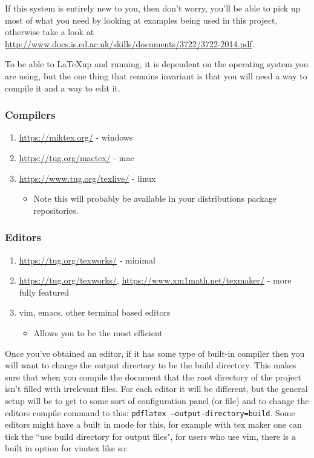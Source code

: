 If this system is entirely new to you, then don't worry, you'll be able to pick
up most of what you need by looking at examples being used in this project,
otherwise take a look at
\url{http://www.docs.is.ed.ac.uk/skills/documents/3722/3722-2014.pdf}.

To be able to \LaTeX up and running, it is dependent on the operating system you
are using, but the one thing that remains invariant is that you will need a way
to compile it and a way to edit it.


\subsubsection*{Compilers}
\begin{enumerate}
    \item \url{https://miktex.org/} - windows
    \item \url{https://tug.org/mactex/} - mac
    \item \url{https://www.tug.org/texlive/} - linux 
    \begin{itemize}
        \item Note this will probably be available in your distributions package
        repositories.
    \end{itemize}
\end{enumerate}

\subsubsection*{Editors}
\begin{enumerate}
   \item \url{https://tug.org/texworks/} - minimal
   \item \url{https://tug.org/texworks/},
   \url{https://www.xm1math.net/texmaker/} - more fully featured
    \item vim, emacs, other terminal based editors
    \begin{itemize}
        \item Allows you to be the most efficient
    \end{itemize}
\end{enumerate}

Once you've obtained an editor, if it has some type of built-in compiler then
you will want to change the output directory to be the build directory. This
makes sure that when you compile the document that the root directory of the
project isn't filled with irrelevant files. For each editor it will be
different, but the general setup will be to get to some sort of configuration
panel (or file) and to change the editors compile command to this:
\texttt{pdflatex --output-directory=build}. Some editors might have a built in
mode for this, for example with tex maker one can tick the ``use build directory
for output files", for users who use vim, there is a built in option for vimtex
like so:

